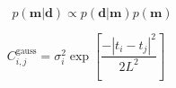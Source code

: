 \[p\left( {{\mathbf{m}}\left| {\mathbf{d}} \right.} \right) \propto p\left( {{\mathbf{d}}\left| {\mathbf{m}} \right.} \right)p\left( {\mathbf{m}} \right)\]%


\[C_{i,j}^{{\text{gauss}}} = \sigma _i^2\exp \left[ {\frac{{ - {{\left| {{t_i} - {t_j}} \right|}^2}}}{{2{L^2}}}} \right]\quad \]%


